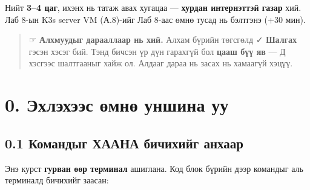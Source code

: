 Нийт \textbf{3--4 цаг}, ихэнх нь татаж авах хугацаа --- \textbf{хурдан интернэттэй газар} хий. Лаб 8-ын K3s server VM (А.8)-ийг Лаб 8-аас өмнө тусад нь бэлтгэнэ (+30 мин).

\begin{quote}
☞ \textbf{Алхмуудыг дарааллаар нь хий.} Алхам бүрийн төгсгөлд ✓ \textbf{Шалгах} гэсэн хэсэг бий. Тэнд бичсэн үр дүн гарахгүй бол \textbf{цааш бүү яв} --- Д хэсгээс шалтгааныг хайж ол. Алдааг дараа нь засах нь хамаагүй хэцүү.
\end{quote}

\hypertarget{ux44dux445ux43bux44dux445ux44dux44dux441-ux4e9ux43cux43dux4e9-ux443ux43dux448ux438ux43dux430-ux443ux443}{%
\section{0. Эхлэхээс өмнө уншина уу}\label{ux44dux445ux43bux44dux445ux44dux44dux441-ux4e9ux43cux43dux4e9-ux443ux43dux448ux438ux43dux430-ux443ux443}}

\hypertarget{ux43aux43eux43cux430ux43dux434ux44bux433-ux445ux430ux430ux43dux430-ux431ux438ux447ux438ux445ux438ux439ux433-ux430ux43dux445ux430ux430ux440}{%
\subsection{0.1 Командыг ХААНА бичихийг анхаар}\label{ux43aux43eux43cux430ux43dux434ux44bux433-ux445ux430ux430ux43dux430-ux431ux438ux447ux438ux445ux438ux439ux433-ux430ux43dux445ux430ux430ux440}}

Энэ курст \textbf{гурван өөр терминал} ашиглана. Код блок бүрийн дээр командыг аль терминалд бичихийг заасан:

